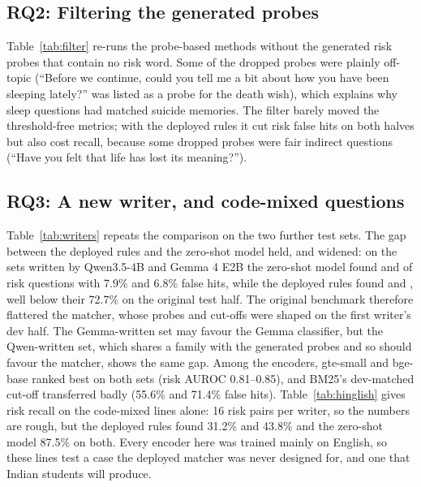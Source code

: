 \documentclass[sn-mathphys-num]{sn-jnl}
\begin{document}
\begin{table}[t]
\caption{Cascade on the test half: the hybrid screens, the language model decides (bold: the floor chosen on the dev half)}
\label{tab:cascade}
\footnotesize

\end{table}

\subsection{RQ2: Filtering the generated probes}
Table~\ref{tab:filter} re-runs the probe-based methods without the generated risk probes that contain no risk word. Some of the dropped probes
were plainly off-topic (``Before we continue, could you tell me a bit about how you have been sleeping lately?'' was listed as a probe for the death
wish), which explains why sleep questions had matched suicide memories. The filter barely moved the threshold-free metrics; with the deployed rules
it cut risk false hits on both halves but also cost recall, because some dropped probes were fair indirect questions (``Have you felt that life has
lost its meaning?'').

\begin{table}[t]
\caption{Effect of the probe quality filter (test half unless stated)}
\label{tab:filter}
\scriptsize

\end{table}

\subsection{RQ3: A new writer, and code-mixed questions}
Table~\ref{tab:writers} repeats the comparison on the two further test sets. The gap between the deployed rules and the zero-shot model held, and
widened: on the sets written by Qwen3.5-4B and Gemma 4 E2B the zero-shot model found \numWQwenLLM{} and \numWGemmaLLM{} of risk questions with
7.9\% and 6.8\% false hits, while the deployed rules found \numWQwenDep{} and \numWGemmaDep, well below their 72.7\% on the original test
half. The original benchmark therefore flattered the matcher, whose probes and cut-offs were shaped on the first writer's dev half. The
Gemma-written set may favour the Gemma classifier, but the Qwen-written set, which shares a family with the generated probes and so should
favour the matcher, shows the same gap. Among the encoders, gte-small and bge-base ranked best on both sets (risk AUROC 0.81--0.85), and BM25's
dev-matched cut-off transferred badly (55.6\% and 71.4\% false hits). Table~\ref{tab:hinglish} gives risk
recall on the code-mixed lines alone: 16 risk pairs per writer, so the numbers are rough, but the deployed rules found 31.2\% and 43.8\% and
the zero-shot model 87.5\% on both. Every encoder here was trained mainly on English, so these lines test a case the deployed matcher was never
designed for, and one that Indian students will produce.
\end{document}
